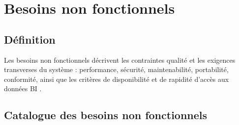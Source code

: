 \documentclass[12pt,a4paper]{report}
\begin{document}
\medskip

\cleardoublepage
\section{Besoins non fonctionnels}

\subsection{Définition}
Les besoins non fonctionnels décrivent les contraintes qualité et les exigences transverses du système : performance, sécurité, maintenabilité, portabilité, conformité, ainsi que les critères de disponibilité et de rapidité d’accès aux données BI \cite{Sommerville2011}.

\subsection{Catalogue des besoins non fonctionnels}
\end{document}
